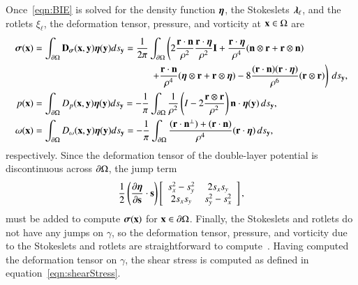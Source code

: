 \documentclass[preprint,10pt]{elsarticle}
\begin{document}
Once~\eqref{eqn:BIE} is solved for the density function ${\boldsymbol\eta}$, the
Stokeslets ${\boldsymbol\lambda}_\ell$, and the rotlets $\xi_\ell$, the deformation
tensor, pressure, and vorticity at ${\mathbf{x}} \in \Omega$ are
\begin{align}
  \label{eqn:deformationDLP} 
  \ssigma(\xx) &= \int_{\bd\Omega} \mathbf{D}_{\ssigma}(\xx,\yy) 
      \eeta(\yy) ds_{\yy} 
  = \frac{1}{2\pi}\int_{\bd\Omega} \left(
    2\frac{\rr \cdot \nn}{\rho^2} \frac{\rr \cdot \eeta}{\rho^2} \II + 
    \frac{\rr \cdot \eeta}{\rho^4} (\nn \otimes \rr + \rr \otimes \nn) 
    \right. \nonumber \\
    & \qquad\qquad\qquad\qquad\qquad\qquad \left.
    +\frac{\rr \cdot \nn}{\rho^4} (\eeta \otimes \rr + \rr \otimes \eeta) - 
    8\frac{(\rr \cdot \nn)(\rr \cdot \eeta)}{\rho^6}(\rr \otimes \rr)
    \right) \, ds_\yy, \\
%
  p(\xx) &= \int_{\bd\Omega} D_{p}(\xx,\yy) 
      \eeta(\yy) ds_{\yy} 
  = -\frac{1}{\pi}\int_{\bd\Omega} \frac{1}{\rho^2}
    \left(I - 2 \frac{\rr \otimes \rr}{\rho^2}\right) \nn \cdot
      \eeta(\yy)\,ds_\yy, \\
%
  \label{eqn:vorticityDLP} 
  \omega(\xx) &= \int_{\bd\Omega} D_{\omega}(\xx,\yy) 
      \eeta(\yy) ds_{\yy} 
  = -\frac{1}{\pi} \int_{\bd\Omega}
    \frac{(\rr \cdot \nn^\perp) + (\rr \cdot \nn)}{\rho^4} 
      (\rr \cdot \eeta) \, ds_\yy,
\end{align}
respectively.  Since the deformation tensor of the double-layer
potential is discontinuous across ${\partial}\Omega$, the jump term 
\begin{align}
  \frac{1}{2} \left(\frac{\partial {\boldsymbol\eta}}{\partial {\mathbf{s}}} \cdot {\mathbf{s}} \right) \left[
    \begin{array}{cc}
      s_x^2 - s_y^2 & 2s_x s_y \\ 2s_x s_y & s_y^2 - s_x^2
    \end{array}
  \right],
  \label{eqn:deformationJump}
\end{align}
must be added to compute ${\boldsymbol\sigma}({\mathbf{x}})$ for ${\mathbf{x}} \in {\partial}\Omega$.
Finally, the Stokeslets and rotlets do not have any jumps on $\gamma$,
so the deformation tensor, pressure, and vorticity due to the Stokeslets
and rotlets are straightforward to compute~\cite{poz1992}.  Having
computed the deformation tensor on $\gamma$, the shear stress is
computed as defined in equation~\eqref{eqn:shearStress}.  

\end{document}
